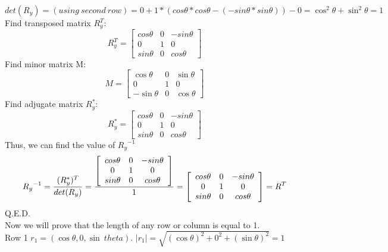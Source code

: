 \documentclass[a4paper, twoside, english]{article}
\begin{document}
${det(R_y)=(using\ second\ row)=0+1*(cos \theta * cos \theta - (-sin \theta * sin \theta)) - 0 = \cos^2 \theta + \sin^2 \theta = 1}$\\
Find transposed matrix $R_y^T$:
\begin{equation*}
	{R_y^T} = \left[
	\begin{array}{ccc}
		cos \theta & 0 & -sin \theta \\
		0 & 1 & 0 \\
		sin \theta & 0 & cos \theta
	\end{array}
	\right]
	\label{eq:kmatrixYT}
\end{equation*}
Find minor matrix M:
\begin{equation*}
	M=\left[
	\begin{array}{ccc}
		\cos\theta&0&\sin\theta\\
		0&1&0\\
		-\sin\theta&0&\cos\theta
	\end{array}
	\right]
\end{equation*}
Find adjugate matrix $R_y^{*}$:
\begin{equation*}
R_y^{*}=\left[
\begin{array}{ccc}
	cos \theta & 0 & -sin \theta \\
	0 & 1 & 0 \\
	sin \theta & 0 & cos \theta
\end{array}
\right]
\end{equation*}
Thus, we can find the value of ${{R_y}^{-1}}$
\begin{equation*}
{R_y}^{-1}={{(R_y^*)^T}\over{det(R_y)}}= {{\left[
		\begin{array}{ccc}
			cos \theta & 0 & -sin \theta \\
			0 & 1 & 0 \\
			sin \theta & 0 & cos \theta
		\end{array}
		\right]}\over {1}} =  {\left[
	\begin{array}{ccc}
	cos \theta & 0 & -sin \theta \\
	0 & 1 & 0 \\
	sin \theta & 0 & cos \theta
\end{array}
\right]} = R^T
\end{equation*} Q.E.D.\\
Now we will prove that the length of any row or column is equal to 1.\\
{Row 1 $r_1=(\cos \theta, 0, \sin \ theta)$. ${{|r_1|}={\sqrt{(\cos \theta)^2+0^2+(\sin \theta)^2}}=1}$}\\
\end{document}
